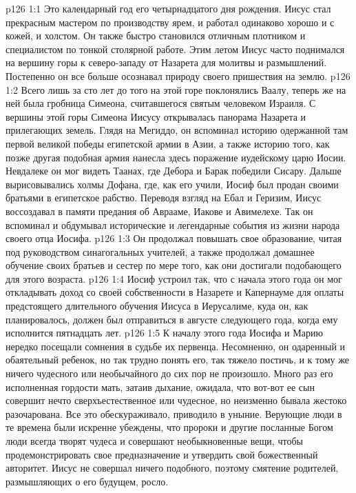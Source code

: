 \vs p126 1:1 Это календарный год его четырнадцатого дня рождения. Иисус стал прекрасным мастером по производству ярем, и работал одинаково хорошо и с кожей, и холстом. Он также быстро становился отличным плотником и специалистом по тонкой столярной работе. Этим летом Иисус часто поднимался на вершину горы к северо\hyp{}западу от Назарета для молитвы и размышлений. Постепенно он все больше осознавал природу своего пришествия на землю.
\vs p126 1:2 Всего лишь за сто лет до того на этой горе поклонялись Ваалу, теперь же на ней была гробница Симеона, считавшегося святым человеком Израиля. С вершины этой горы Симеона Иисусу открывалась панорама Назарета и прилегающих земель. Глядя на Мегиддо, он вспоминал историю одержанной там первой великой победы египетской армии в Азии, а также историю того, как позже другая подобная армия нанесла здесь поражение иудейскому царю Иосии. Невдалеке он мог видеть Таанах, где Дебора и Барак победили Сисару. Дальше вырисовывались холмы Дофана, где, как его учили, Иосиф был продан своими братьями в египетское рабство. Переводя взгляд на Ебал и Геризим, Иисус воссоздавал в памяти предания об Аврааме, Иакове и Авимелехе. Так он вспоминал и обдумывал исторические и легендарные события из жизни народа своего отца Иосифа.
\vs p126 1:3 Он продолжал повышать свое образование, читая под руководством синагогальных учителей, а также продолжал домашнее обучение своих братьев и сестер по мере того, как они достигали подобающего для этого возраста.
\vs p126 1:4 Иосиф устроил так, что с начала этого года он мог откладывать доход со своей собственности в Назарете и Капернауме для оплаты предстоящего длительного обучения Иисуса в Иерусалиме, куда он, как планировалось, должен был отправиться в августе следующего года, когда ему исполнится пятнадцать лет.
\vs p126 1:5 К началу этого года Иосифа и Марию нередко посещали сомнения в судьбе их первенца. Несомненно, он одаренный и обаятельный ребенок, но так трудно понять его, так тяжело постичь, и к тому же ничего чудесного или необычайного до сих пор не произошло. Много раз его исполненная гордости мать, затаив дыхание, ожидала, что вот\hyp{}вот ее сын совершит нечто сверхъестественное или чудесное, но неизменно бывала жестоко разочарована. Все это обескураживало, приводило в уныние. Верующие люди в те времена были искренне убеждены, что пророки и другие посланные Богом люди всегда творят чудеса и совершают необыкновенные вещи, чтобы продемонстрировать свое предназначение и утвердить свой божественный авторитет. Иисус не совершал ничего подобного, поэтому смятение родителей, размышляющих о его будущем, росло.
